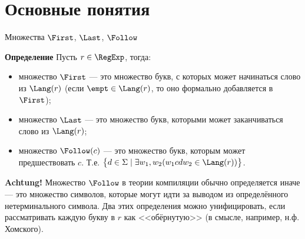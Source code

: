 \section{Основные понятия} %

\begin{frame}{Множества $\First$, $\Last$, $\Follow$}
  \vspace{-5pt}%
  \begin{block}{\bf Определение}
    Пусть $r\in\RegExp$, тогда:
    \begin{itemize}
      \item множество $\First$ --- это множество букв, с которых может начинаться слово из $\Lang(r)$ (если $\empt\in\Lang(r)$, то оно формально добавляется в $\First$);
      \item множество $\Last$ --- это множество букв, которыми может заканчиваться слово из $\Lang(r)$;
      \item множество $\Follow(c)$ --- это множество букв, которым может предшествовать $c$. Т.е. $\bigl\lbrace d\in\Sigma\mid \exists w_1,w_2(w_1 c d w_2\in\Lang(r))\bigr\rbrace$.
    \end{itemize}
  \end{block} %

  \begin{alertblock}{\bf Achtung!}
    \small
    Множество $\Follow$ в теории компиляции обычно определяется иначе --- это множество символов, которые могут идти за выводом из определённого нетерминального символа. Два этих определения можно унифицировать, если рассматривать каждую букву в $r$ как <<обёрнутую>> (в смысле, например, н.ф. Хомского).
  \end{alertblock} %
\end{frame}

